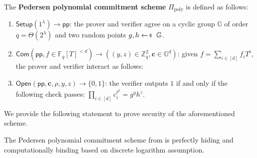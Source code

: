 \documentclass[../../book]{subfiles}
\begin{document}
\begin{definition}\label{def:pedersen-poly-commitment}
    The \textbf{Pedersen polynomial commitment scheme} $\Pi_{\text{poly}}$ is defined as follows:
    \begin{enumerate}
        \item $\mathsf{Setup}(1^{\lambda}) \to \mathsf{pp}$: the prover and verifier agree on a cyclic group $\mathbb{G}$ of order $q = \Theta(2^{\lambda})$ and two random points $g,h \leftarrowS \mathbb{G}$.
        \item $\mathsf{Com}(\mathsf{pp}, f \in \mathbb{F}_q[T]^{<d}) \to ((y,z) \in \mathbb{Z}_q^2, \mathbf{c} \in \mathbb{G}^d)$: given $f=\sum_{i \in [d]}f_iT^i$, the prover and verifier interact as follows:
        \item $\mathsf{Open}(\mathsf{pp}, \mathbf{c}, \rho, y, z) \to \{0,1\}$: the verifier outputs $1$ if and only if the following check passes: $\prod_{i \in [d]} c_i^{\rho^i} = g^yh^z$.
    \end{enumerate}
\end{definition}

We provide the following statement to prove security of the aforementioned scheme.

\begin{lemma}
    The Pedersen polynomial commitment scheme from  is perfectly hiding and computationally binding based on discrete logarithm assumption.
\end{lemma}
\end{document}
